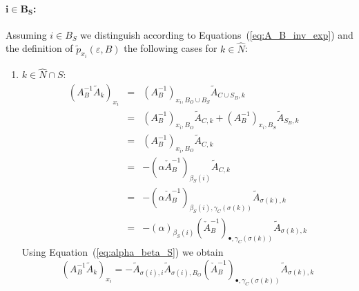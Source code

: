 \documentclass[a4paper]{article}
\begin{document}
\paragraph{$\mathbf{i \in B_{S}}$:}
Assuming $i \in B_{S}$ we distinguish
according to Equations~(\ref{eq:A_B_inv_exp})
and the definition of $\tilde{p}_{x_{i}}(\varepsilon, B)$
the following cases for $k \in \hat{N}$:
\begin{enumerate}
\item $k \in \hat{N} \cap S$:
\begin{eqnarray}
  (A_{B}^{-1}\tilde{A}_{k})_{x_{i}} &=& 
  (A_{B}^{-1})_{x_{i}, B_{O} \cup B_{S}}\tilde{A}_{C \cup S_{B}, k}
  \nonumber \\
  &=& 
  (A_{B}^{-1})_{x_{i}, B_{O}}\tilde{A}_{C, k} +
  (A_{B}^{-1})_{x_{i}, B_{S}}\tilde{A}_{S_{B}, k}
  \nonumber \\
  &=&
  (A_{B}^{-1})_{x_{i}, B_{O}}\tilde{A}_{C, k}
  \nonumber \\ 
  &=&
  -\left(\alpha\check{A}_{B}^{-1}\right)_{\beta_{S}(i)}\tilde{A}_{C, k}
  \nonumber \\
  &=&
  -\left(\alpha\check{A}_{B}^{-1}\right)_{\beta_{S}(i), \gamma_{C}(\sigma(k))}
  \tilde{A}_{\sigma(k), k}
  \nonumber \\
  &=&
  -\left(\alpha\right)_{\beta_{S}(i)}
  \left(\check{A}_{B}^{-1}\right)_{\bullet, \gamma_{C}(\sigma(k))}
  \tilde{A}_{\sigma(k), k}
  \nonumber
\end{eqnarray}
Using Equation~(\ref{eq:alpha_beta_S}) we obtain
\begin{equation}
(A_{B}^{-1}\tilde{A}_{k})_{x_{i}} =
  -\tilde{A}_{\sigma(i), i}\tilde{A}_{\sigma(i), B_{O}}
  \left(\check{A}_{B}^{-1}\right)_{\bullet, \gamma_{C}(\sigma(k))}
  \tilde{A}_{\sigma(k), k}
\end{equation}


\end{enumerate}
\end{document}
